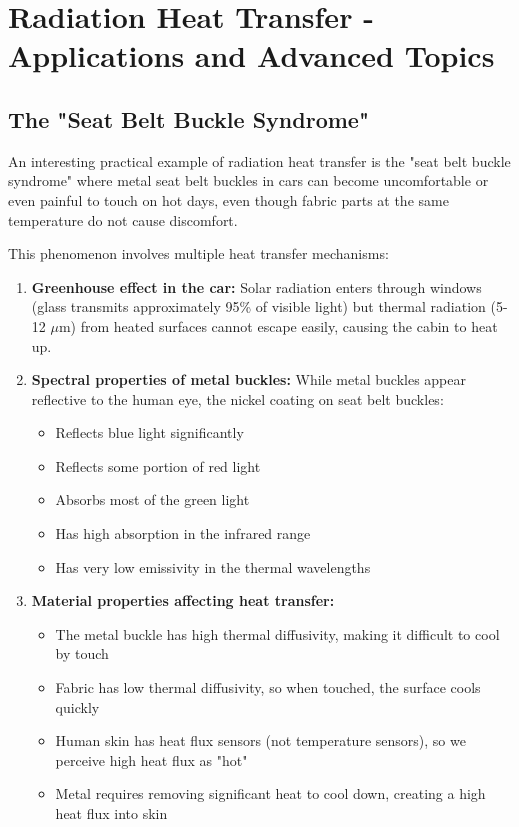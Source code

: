 \section*{Radiation Heat Transfer - Applications and Advanced Topics}
\subsection*{The "Seat Belt Buckle Syndrome"}
An interesting practical example of radiation heat transfer is the "seat belt buckle syndrome" where metal seat belt buckles in cars can become uncomfortable or even painful to touch on hot days, even though fabric parts at the same temperature do not cause discomfort.

This phenomenon involves multiple heat transfer mechanisms:

\begin{enumerate}
    \item \textbf{Greenhouse effect in the car:} Solar radiation enters through windows (glass transmits approximately 95\% of visible light) but thermal radiation (5-12 $\mu$m) from heated surfaces cannot escape easily, causing the cabin to heat up.
    
    \item \textbf{Spectral properties of metal buckles:} While metal buckles appear reflective to the human eye, the nickel coating on seat belt buckles:
    \begin{itemize}
        \item Reflects blue light significantly
        \item Reflects some portion of red light
        \item Absorbs most of the green light
        \item Has high absorption in the infrared range
        \item Has very low emissivity in the thermal wavelengths
    \end{itemize}
    
    \item \textbf{Material properties affecting heat transfer:}
    \begin{itemize}
        \item The metal buckle has high thermal diffusivity, making it difficult to cool by touch
        \item Fabric has low thermal diffusivity, so when touched, the surface cools quickly
        \item Human skin has heat flux sensors (not temperature sensors), so we perceive high heat flux as "hot"
        \item Metal requires removing significant heat to cool down, creating a high heat flux into skin
    \end{itemize}
\end{enumerate}

